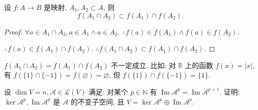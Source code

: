 \documentclass{ctexart}
\begin{document}
\begin{lemma}\label{l5.1}
    设 $f:A\to B$ 是映射, $A_1,A_2\subset A$, 则
    \[f(A_1\cap A_2)\subset f(A_1)\cap f(A_2).\]
\end{lemma}
\begin{proof}
    $\forall a\in A_1\cap A_2,a\in A_1\land a\in A_2$. $\therefore f(a)\in f(A_1)\land f(a)\in f(A_2)$.
    
    $\therefore f(a)\in f(A_1)\cap f(A_2)$. $\therefore f(A_1\cap A_2)\subset f(A_1)\cap f(A_2)$.
\end{proof}
\begin{note}
    $f(A_1\cap A_2)=f(A_1)\cap f(A_2)$ 不一定成立. 比如: 对 $\mathbb{R}$ 上的函数 $f(x)=|x|$, 有 $f(\{1\}\cap\{-1\})=f(\varnothing)=\varnothing$, 但 $f(\{1\})\cap f(\{-1\})=\{1\}$.
\end{note}
\begin{exercise}\label{ex3.3}
    设 $\dim V=n,\mathcal{A}\in\mathcal{L}(V)$ 满足: 对某个 $p\in\mathbb{N}$ 有 $\operatorname{Im}\mathcal{A}^p=\operatorname{Im}\mathcal{A}^{p+1}$. 证明: $\ker\mathcal{A}^p,\operatorname{Im}\mathcal{A}^p$ 是 $\mathcal{A}$ 的不变子空间, 且 $V=\ker\mathcal{A}^p\oplus\operatorname{Im}\mathcal{A}^p$.
\end{exercise}
\end{document}
